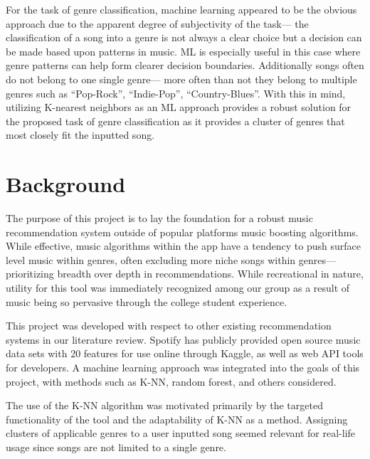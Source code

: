 \documentclass[times, twocolumn]{article}
\begin{document}
For the task of genre classification, machine learning appeared to be the obvious approach due to the apparent degree of subjectivity of the task— the classification of a song into a genre is not always a clear choice but a decision can be made based upon patterns in music. ML is especially useful in this case where genre patterns can help form clearer decision boundaries. Additionally songs often do not belong to one single genre— more often than not they belong to multiple genres such as “Pop-Rock”, “Indie-Pop”, “Country-Blues”. With this in mind, utilizing K-nearest neighbors as an ML approach provides a robust solution for the proposed task of genre classification as it provides a cluster of genres that most closely fit the inputted song. 

\section{Background}
The purpose of this project is to lay the foundation for a robust music recommendation system outside of popular platforms music boosting algorithms. While effective, music algorithms within the app have a tendency to push surface level music within genres, often excluding more niche songs within genres— prioritizing breadth over depth in recommendations. While recreational in nature, utility for this tool was immediately recognized among our group as a result of music being so pervasive through the college student experience. 

This project was developed with respect to other existing recommendation systems in our literature review. Spotify has publicly provided open source music data sets with 20 features for use online through Kaggle, as well as web API tools for developers. A machine learning approach was integrated into the goals of this project, with methods such as K-NN, random forest, and others considered. 

The use of the  K-NN algorithm was motivated primarily by the targeted functionality of the tool and the adaptability of K-NN as a method. Assigning clusters of applicable genres to a user inputted song seemed relevant for real-life usage since songs are not limited to a single genre. 
\end{document}
